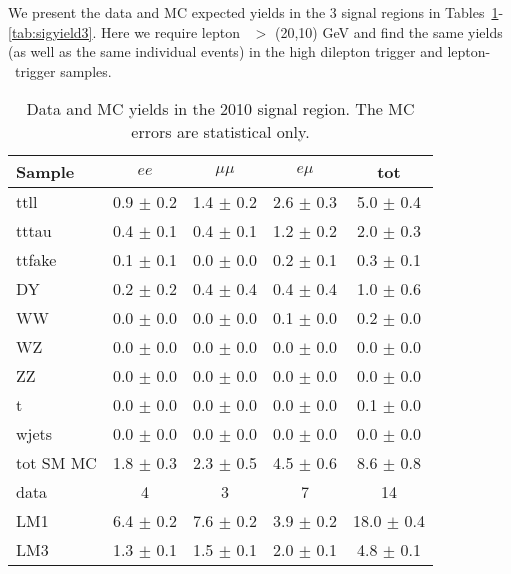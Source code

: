 We present the data and MC expected yields in the 3 signal regions in 
Tables~\ref{tab:sigyield1}-\ref{tab:sigyield3}.
Here we require lepton \pt\ $>$ (20,10) GeV and find
the same yields (as well as the same individual events) in the high \pt dilepton
trigger and lepton-\Ht\ trigger samples. 

\newpage

\begin{table}[hbt]
\begin{center}
\caption{\label{tab:sigyield1} Data and MC yields in the 2010 signal region. 
The MC errors are statistical only.}
\begin{tabular}{l|cccc}
\hline
         Sample   &           $ee$   &       $\mu\mu$   &         $e\mu$   &            tot  \\
\hline
           ttll   &  0.9 $\pm$ 0.2   &  1.4 $\pm$ 0.2   &  2.6 $\pm$ 0.3   &  5.0 $\pm$ 0.4  \\
          tttau   &  0.4 $\pm$ 0.1   &  0.4 $\pm$ 0.1   &  1.2 $\pm$ 0.2   &  2.0 $\pm$ 0.3  \\
         ttfake   &  0.1 $\pm$ 0.1   &  0.0 $\pm$ 0.0   &  0.2 $\pm$ 0.1   &  0.3 $\pm$ 0.1  \\
             DY   &  0.2 $\pm$ 0.2   &  0.4 $\pm$ 0.4   &  0.4 $\pm$ 0.4   &  1.0 $\pm$ 0.6  \\
             WW   &  0.0 $\pm$ 0.0   &  0.0 $\pm$ 0.0   &  0.1 $\pm$ 0.0   &  0.2 $\pm$ 0.0  \\
             WZ   &  0.0 $\pm$ 0.0   &  0.0 $\pm$ 0.0   &  0.0 $\pm$ 0.0   &  0.0 $\pm$ 0.0  \\
             ZZ   &  0.0 $\pm$ 0.0   &  0.0 $\pm$ 0.0   &  0.0 $\pm$ 0.0   &  0.0 $\pm$ 0.0  \\
              t   &  0.0 $\pm$ 0.0   &  0.0 $\pm$ 0.0   &  0.0 $\pm$ 0.0   &  0.1 $\pm$ 0.0  \\
          wjets   &  0.0 $\pm$ 0.0   &  0.0 $\pm$ 0.0   &  0.0 $\pm$ 0.0   &  0.0 $\pm$ 0.0  \\
\hline
      tot SM MC   &  1.8 $\pm$ 0.3   &  2.3 $\pm$ 0.5   &  4.5 $\pm$ 0.6   &  8.6 $\pm$ 0.8  \\
\hline
           data   &              4   &              3   &              7   &             14  \\
\hline
            LM1   &  6.4 $\pm$ 0.2   &  7.6 $\pm$ 0.2   &  3.9 $\pm$ 0.2   & 18.0 $\pm$ 0.4  \\
            LM3   &  1.3 $\pm$ 0.1   &  1.5 $\pm$ 0.1   &  2.0 $\pm$ 0.1   &  4.8 $\pm$ 0.1  \\
\hline
\end{tabular}
\end{center}
\end{table}


